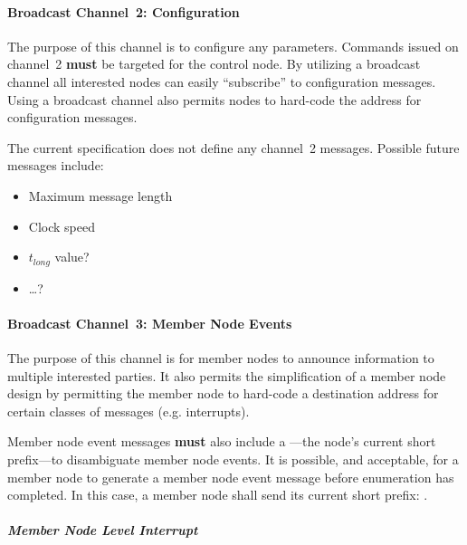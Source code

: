 \paragraph{Broadcast Channel~2: \bus Configuration}
\label{sec:channel-2}

The purpose of this channel is to configure any \bus parameters. Commands
issued on channel~2 {\bf must} be targeted for the control node. By utilizing
a broadcast channel all interested nodes can easily ``subscribe'' to
configuration messages. Using a broadcast channel also permits nodes to
hard-code the address for configuration messages.

The current \bus specification does not define any channel~2 messages.
Possible future messages include:
\begin{itemize}
  \item Maximum message length
  \item Clock speed
  \item $t_{long}$ value?
  \item \ldots?
\end{itemize}

\paragraph{Broadcast Channel~3: Member Node Events}
\label{sec:channel-3}

The purpose of this channel is for member nodes to announce information to
multiple interested parties. It also permits the simplification of a member
node design by permitting the member node to hard-code a destination address
for certain classes of messages (e.g. interrupts).

Member node event messages {\bf must} also include a ---the node's current short prefix---to disambiguate member
node events. It is possible, and acceptable, for a member node to generate a
member node event message before enumeration has completed. In this case, a
member node shall send its current short prefix:
.


\subparagraph{Member Node Level Interrupt}
\label{cmd:level-interrupt}
~

~

